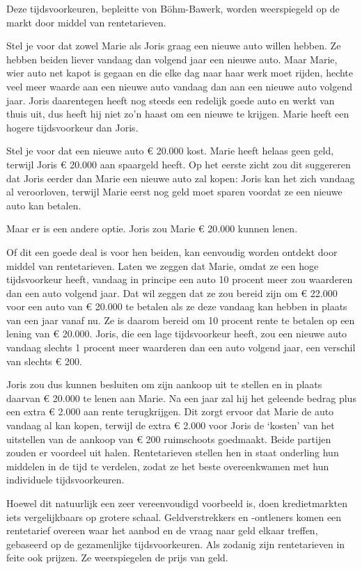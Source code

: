 \documentclass[
  a5paper,
  smalldemyvopaper,11pt,twoside,onecolumn,openright,extrafontsizes]{memoir}
\begin{document}
Deze tijdsvoorkeuren, bepleitte von Böhm-Bawerk, worden weerspiegeld op
de markt door middel van rentetarieven.

Stel je voor dat zowel Marie als Joris graag een nieuwe auto willen
hebben. Ze hebben beiden liever vandaag dan volgend jaar een nieuwe
auto. Maar Marie, wier auto net kapot is gegaan en die elke dag naar
haar werk moet rijden, hechte veel meer waarde aan een nieuwe auto
vandaag dan aan een nieuwe auto volgend jaar. Joris daarentegen heeft
nog steeds een redelijk goede auto en werkt van thuis uit, dus heeft hij
niet zo'n haast om een nieuwe te krijgen. Marie heeft een hogere
tijdsvoorkeur dan Joris.

Stel je voor dat een nieuwe auto € 20.000 kost. Marie heeft helaas geen
geld, terwijl Joris € 20.000 aan spaargeld heeft. Op het eerste zicht
zou dit suggereren dat Joris eerder dan Marie een nieuwe auto zal kopen:
Joris kan het zich vandaag al veroorloven, terwijl Marie eerst nog geld
moet sparen voordat ze een nieuwe auto kan betalen.

Maar er is een andere optie. Joris zou Marie € 20.000 kunnen lenen.

Of dit een goede deal is voor hen beiden, kan eenvoudig worden ontdekt
door middel van rentetarieven. Laten we zeggen dat Marie, omdat ze een
hoge tijdsvoorkeur heeft, vandaag in principe een auto 10 procent meer
zou waarderen dan een auto volgend jaar. Dat wil zeggen dat ze zou
bereid zijn om € 22.000 voor een auto van € 20.000 te betalen als ze
deze vandaag kan hebben in plaats van een jaar vanaf nu. Ze is daarom
bereid om 10 procent rente te betalen op een lening van € 20.000. Joris,
die een lage tijdsvoorkeur heeft, zou een nieuwe auto vandaag slechts 1
procent meer waarderen dan een auto volgend jaar, een verschil van
slechts € 200.

Joris zou dus kunnen besluiten om zijn aankoop uit te stellen en in
plaats daarvan € 20.000 te lenen aan Marie. Na een jaar zal hij het
geleende bedrag plus een extra € 2.000 aan rente terugkrijgen. Dit zorgt
ervoor dat Marie de auto vandaag al kan kopen, terwijl de extra € 2.000
voor Joris de `kosten' van het uitstellen van de aankoop van € 200
ruimschoots goedmaakt. Beide partijen zouden er voordeel uit halen.
Rentetarieven stellen hen in staat onderling hun middelen in de tijd te
verdelen, zodat ze het beste overeenkwamen met hun individuele
tijdsvoorkeuren.

Hoewel dit natuurlijk een zeer vereenvoudigd voorbeeld is, doen
kredietmarkten iets vergelijkbaars op grotere schaal. Geldverstrekkers
en -ontleners komen een rentetarief overeen waar het aanbod en de vraag
naar geld elkaar treffen, gebaseerd op de gezamenlijke tijdsvoorkeuren.
Als zodanig zijn rentetarieven in feite ook prijzen. Ze weerspiegelen de
prijs van geld.
\end{document}
